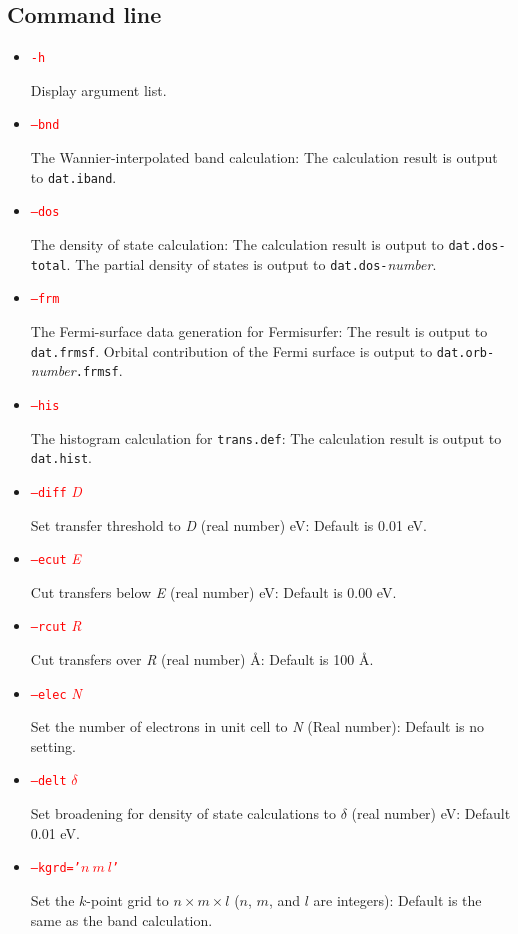 \documentclass{article}
\newcommand{\tr}[1]{\textcolor{red}{#1}}
\begin{document}
\subsection{\label{command}Command line}
\begin{itemize}
\item \tr{{\tt -h}} 

Display argument list.

\item \tr{{\tt --bnd}}

The Wannier-interpolated band calculation: The calculation result is output to {\tt dat.iband}.

\item \tr{{\tt --dos}} 

The density of state calculation: The calculation result is output to {\tt dat.dos-total}. The partial density of states is output to {\tt dat.dos-}{\it number}.

\item \tr{{\tt --frm}} 

The Fermi-surface data generation for {\sc Fermisurfer}: The result is output to {\tt dat.frmsf}. Orbital contribution of the Fermi surface is output to {\tt dat.orb-}{\it number}{\tt .frmsf}.

\item \tr{{\tt --his}} 

The histogram calculation for {\tt trans.def}: The calculation result is output to {\tt dat.hist}.

\item \tr{{\tt --diff} {\it D}}

Set transfer threshold to {\it D} (real number) eV: Default is 0.01 eV.

\item \tr{{\tt --ecut} {\it E}}

Cut transfers below {\it E} (real number) eV: Default is 0.00 eV. 

\item \tr{{\tt --rcut} {\it R}}

Cut transfers over {\it R} (real number) \AA: Default is 100 \AA.

\item \tr{{\tt --elec} {\it N}} 

Set the number of electrons in unit cell to {\it N} (Real number): Default is no setting. 

\item \tr{{\tt --delt} $\delta$} 

Set broadening for density of state calculations to $\delta$ (real number) eV: Default 0.01 eV. 

\item \tr{{\tt --kgrd='}$n\ m\ l${\tt '}}

Set the $k$-point grid to $n \times m \times l$ ($n$, $m$, and $l$ are integers): Default is the same as the band calculation.

\end{itemize} 
\end{document}
